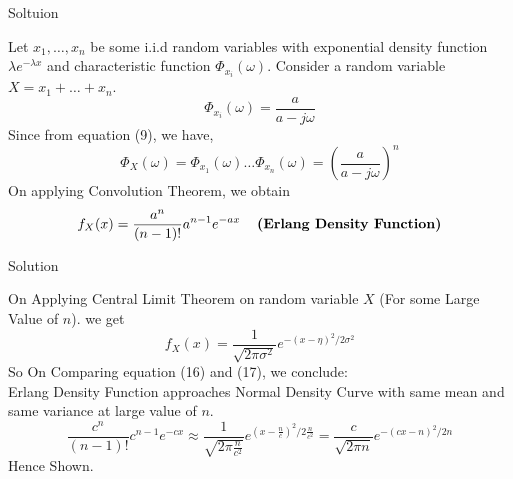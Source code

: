 \documentclass{beamer}
\begin{document}
\begin{frame}{Soltuion}
    \begin{block}{}
        Let $x_1,\ldots,x_n$ be some i.i.d random variables with exponential density function $\lambda e^{-\lambda x}$ and characteristic function $\Phi_{x_i}(\omega)$. Consider a random variable $X = x_1+\ldots+x_n$.
        \begin{equation}
            \Phi_{x_i}(\omega) = \frac{a}{a-j\omega}
        \end{equation}
        Since from equation (9), we have,
        \begin{equation}
            \Phi_X(\omega) = \Phi_{x_1}(\omega)\ldots \Phi_{x_n}(\omega) = \left(\frac{a}{a-j\omega}\right)^n
        \end{equation}
        On applying Convolution Theorem, we obtain
        \begin{equation}
            f_X(x) = \frac{a^n}{(n-1)!}a^{n-1}e^{-ax} \hspace*{12pt} \textbf{(Erlang Density Function)}
        \end{equation}
    \end{block}
\end{frame}
\begin{frame}{Solution}
    \begin{block}{}
        On Applying Central Limit Theorem on random variable $X$ (For some Large Value of $n$). we get
        \begin{equation}
            f_X(x) = \frac{1}{\sqrt{2\pi \sigma^2}}e^{-(x-\eta)^2/2\sigma^2}
        \end{equation}
        So On Comparing equation (16) and (17), we conclude:\\
        Erlang Density Function approaches Normal Density Curve with same mean and same variance at large value of $n$.
        \begin{equation}
           \frac{c^n}{(n-1)!}c^{n-1}e^{-cx} \approx \frac{1}{\sqrt{2\pi \frac{n}{c^2}}}e^{(x-\frac{n}{c})^2/2\frac{n}{c^2}} =\frac{c}{\sqrt{2\pi n}}e^{-(cx-n)^2/2n} 
        \end{equation}
        Hence Shown.
    \end{block}
\end{frame}
\end{document}
